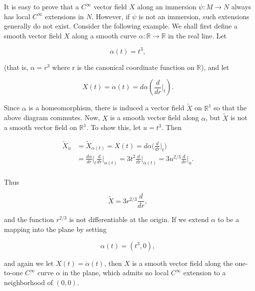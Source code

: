 \begin{remarks}\label{thm:1.52}
	It is easy to prove that a $C^{\infty}$ vector field $X$ along an immersion $\psi: M \to N$ always has local $C^{\infty}$ extensions in $N$. However, if $\psi$ is not an immersion, such extensions generally do not exist. Consider the following example. We shall first define a smooth vector field $X$ along a smooth curve $\alpha: \mathbb{R} \to \mathbb{R}$ in the real line. Let

	\begin{equation}
		\tag{1}\label{eq:1.52:1}
		\alpha(t)=t^{3},
	\end{equation}

	(that is,  $ \alpha = r^{3} $ where r is the canonical coordinate function on  $ \mathbb{R} $), and let

	\begin{equation}
		\tag{2}\label{eq:1.52:2}
		X(t)=\dot{\alpha}(t)=d\alpha\left(\frac{d}{d r}\bigg|_{t}\right).
	\end{equation}

	\begin{center}
	\end{center}

	Since $\alpha$ is a homeomorphism, there is induced a vector field $\tilde{X}$ on $\mathbb{R}^{1}$ so that the above diagram commutes. Now, $X$ is a smooth vector field along $\alpha$, but $\tilde{X}$ is not a smooth vector field on $\mathbb{R}^{1}$. To show this, let $u = t^{3}$. Then

	\begin{equation}
		\tag{3}\label{eq:1.52:3}
		\begin{aligned}{\tilde{X}_{u}}&{{}=\tilde{X}_{\alpha(t)}=X(t)=d\alpha\bigg(\frac{d}{d r}\bigg|_{t}\bigg)}\\ {}&{{}=\frac{d\alpha}{d r}\bigg|_{t}\frac{d}{d r}\bigg|_{\alpha(t)}=3t^{2}\frac{d}{d r}\bigg|_{\alpha(t)}=3u^{2/3}\frac{d}{d r}\bigg|_{u}.}\\ \end{aligned}
	\end{equation}

	Thus

	\begin{equation}
		\tag{4}\label{eq:1.52:4}
		\tilde{X}=3r^{2/3}\frac{d}{d r},
	\end{equation}

	and the function  $ r^{2/3} $ is not differentiable at the origin. If we extend  $ \alpha $ to be a mapping into the plane by setting

	\begin{equation}
		\tag{5}\label{eq:1.52:5}
		\alpha(t)=(t^{3},0),
	\end{equation}

	and again we let $X(t)=\dot{\alpha}(t)$, then $X$ is a smooth vector field along the one-to-one $C^{\infty}$ curve $\alpha$ in the plane, which admits no local $C^{\infty}$ extension to a neighborhood of $(0,0)$.

\end{remarks}

